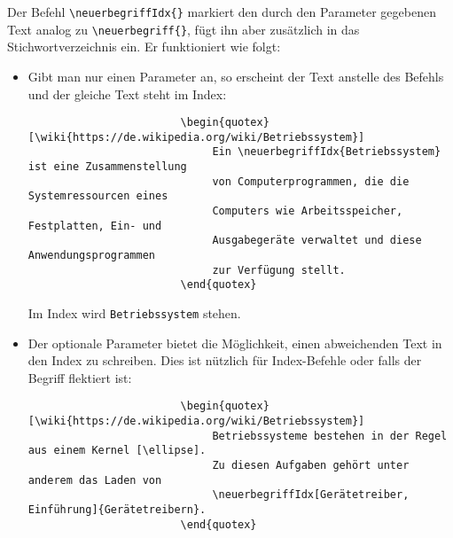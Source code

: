 			
			\newpage
			Der Befehl \verb|\neuerbegriffIdx{}| markiert den durch den Parameter gegebenen Text analog zu \verb|\neuerbegriff{}|, fügt ihn aber zusätzlich in das Stichwortverzeichnis ein. Er funktioniert wie folgt:
			\begin{itemize}
				\item 
					Gibt man nur einen Parameter an, so erscheint der Text anstelle des Befehls und der gleiche Text steht im Index: \\
					\begin{verbatim}
						\begin{quotex}[\wiki{https://de.wikipedia.org/wiki/Betriebssystem}]
						     Ein \neuerbegriffIdx{Betriebssystem} ist eine Zusammenstellung 
						     von Computerprogrammen, die die Systemressourcen eines 
						     Computers wie Arbeitsspeicher, Festplatten, Ein- und 
						     Ausgabegeräte verwaltet und diese Anwendungsprogrammen 
						     zur Verfügung stellt. 
						\end{quotex}
					\end{verbatim}
					
					
					Im Index wird \texttt{Betriebssystem} stehen.
				
				\item 
					Der optionale Parameter bietet die Möglichkeit, einen abweichenden Text in den Index zu schreiben. Dies ist nützlich für Index-Befehle oder falls der Begriff flektiert ist:
					\begin{verbatim}
						\begin{quotex}[\wiki{https://de.wikipedia.org/wiki/Betriebssystem}]
						     Betriebssysteme bestehen in der Regel aus einem Kernel [\ellipse]. 
						     Zu diesen Aufgaben gehört unter anderem das Laden von 
						     \neuerbegriffIdx[Gerätetreiber, Einführung]{Gerätetreibern}.
						\end{quotex}
					\end{verbatim}
					

\end{itemize}
